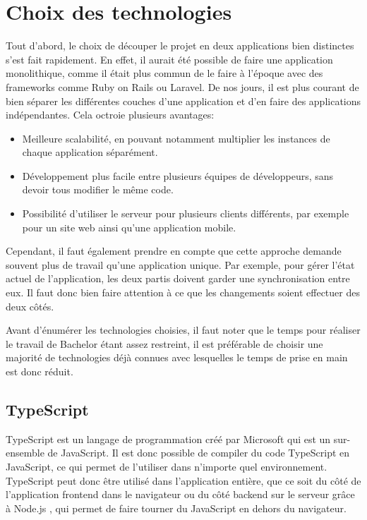 \section{Choix des technologies}

Tout d'abord, le choix de découper le projet en deux applications bien distinctes s'est fait rapidement. En effet, il aurait été possible de faire une application monolithique, comme il était plus commun de le faire à l'époque avec des frameworks comme Ruby on Rails ou Laravel. De nos jours, il est plus courant de bien séparer les différentes couches d'une application et d'en faire des applications indépendantes. Cela octroie plusieurs avantages:

\begin{itemize}
  \item Meilleure scalabilité, en pouvant notamment multiplier les instances de chaque application séparément.
  \item Développement plus facile entre plusieurs équipes de développeurs, sans devoir tous modifier le même code.
  \item Possibilité d'utiliser le serveur pour plusieurs clients différents, par exemple pour un site web ainsi qu'une application mobile.
\end{itemize}

Cependant, il faut également prendre en compte que cette approche demande souvent plus de travail qu'une application unique. Par exemple, pour gérer l'état actuel de l'application, les deux partis doivent garder une synchronisation entre eux. Il faut donc bien faire attention à ce que les changements soient effectuer des deux côtés.

Avant d'énumérer les technologies choisies, il faut noter que le temps pour réaliser le travail de Bachelor étant assez restreint, il est préférable de choisir une majorité de technologies déjà connues avec lesquelles le temps de prise en main est donc réduit.

\subsection{TypeScript}

TypeScript \cite{typescript} est un langage de programmation créé par Microsoft qui est un sur-ensemble de JavaScript. Il est donc possible de compiler du code TypeScript en JavaScript, ce qui permet de l'utiliser dans n'importe quel environnement. TypeScript peut donc être utilisé dans l'application entière, que ce soit du côté de l'application frontend dans le navigateur ou du côté backend sur le serveur grâce à Node.js \cite{nodejs}, qui permet de faire tourner du JavaScript en dehors du navigateur.

